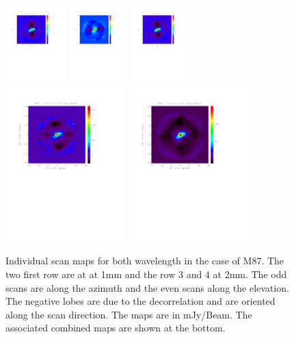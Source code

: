 \documentclass[a4paper]{article}
\begin{document}
\begin{figure}
\includegraphics[height=3cm, trim=2cm 13cm 4cm 2cm, clip=true]{Figure/map_2mm_scan20121124s0110}
\includegraphics[height=3cm, trim=2cm 13cm 4cm 2cm, clip=true]{Figure/map_2mm_scan20121124s0112}
\includegraphics[height=3cm, trim=2cm 13cm 4cm 2cm, clip=true]{Figure/map_2mm_scan20121124s0113}
\includegraphics[height=6cm, trim=2cm 13cm 4cm 2cm, clip=true]{Figure/M87_flux_map_1mm}
\includegraphics[height=6cm, trim=2cm 13cm 4cm 2cm, clip=true]{Figure/M87_flux_map_2mm}
\caption{Individual scan maps for both wavelength in the case of M87. The two first row are at at 1mm and the row 3 and 4 at 2mm. The odd scans are along the azimuth and the even scans along the elevation. The negative lobes are due to the decorrelation and are oriented along the scan direction. The maps are in mJy/Beam. The associated combined maps are shown at the bottom.}
\label{fig:M87_map_per_scan}
\end{figure}
\end{document}
